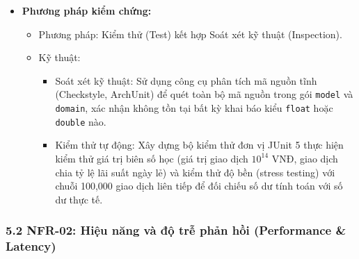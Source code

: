 \documentclass[11pt,a4paper]{article}
\providecommand{\tightlist}{
  \setlength{\itemsep}{0pt}\setlength{\parskip}{0pt}}
\begin{document}
\begin{itemize}
  \begin{itemize}
  \tightlist
  \item
    Sai số tích lũy số học cho phép: 0.00 VNĐ (tuyệt đối không sai
    lệch).
  \item
    Tỷ lệ vi phạm bất biến bảo toàn số dư \texttt{BR-FIN-02}: 0.00\%
    trên toàn bộ tập dữ liệu kiểm thử.
  \item
    Tỷ lệ xuất hiện kiểu dữ liệu \texttt{float} hoặc \texttt{double}
    trong các lớp thực thể miền (Domain Entities): 0.00\%.
  \item
    Độ chính xác số học: Scale = 2 cho số tiền giao dịch; Scale
    \(\ge 4\) cho số lượng chứng chỉ quỹ và giá trị NAV.
  \end{itemize}
\item
  \textbf{Phương pháp kiểm chứng:}

  \begin{itemize}
  \tightlist
  \item
    Phương pháp: Kiểm thử (Test) kết hợp Soát xét kỹ thuật (Inspection).
  \item
    Kỹ thuật:

    \begin{itemize}
    \tightlist
    \item
      Soát xét kỹ thuật: Sử dụng công cụ phân tích mã nguồn tĩnh
      (Checkstyle, ArchUnit) để quét toàn bộ mã nguồn trong gói
      \texttt{model} và \texttt{domain}, xác nhận không tồn tại bất kỳ
      khai báo kiểu \texttt{float} hoặc \texttt{double} nào.
    \item
      Kiểm thử tự động: Xây dựng bộ kiểm thử đơn vị JUnit 5 thực hiện
      kiểm thử giá trị biên số học (giá trị giao dịch \(10^{14}\) VNĐ,
      giao dịch chia tỷ lệ lãi suất ngày lẻ) và kiểm thử độ bền (stress
      testing) với chuỗi 100,000 giao dịch liên tiếp để đối chiếu số dư
      tính toán với số dư thực tế.
    \end{itemize}
  \end{itemize}
\end{itemize}

\subsubsection{5.2 NFR-02: Hiệu năng và độ trễ phản hồi (Performance \&
Latency)}\label{52-nfr-02-hiux1ec7u-nux103ng-vuxe0-ux111ux1ed9-trux1ec5-phux1ea3n-hux1ed3i-performance--latency}
\end{document}
